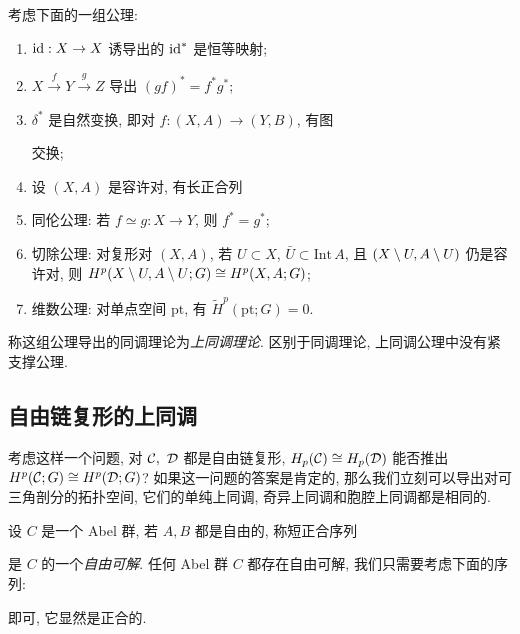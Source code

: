 考虑下面的一组公理:
\begin{enumerate}
	\item $ \mathrm{id} : X\to X $ 诱导出的 $ \mathrm{id}^* $ 是恒等映射;
	\item $ X\stackrel{f}{\to}Y\stackrel{g}{\to}Z $ 导出 $ (gf)^*=f^*g^* $;
	\item $ \delta^* $ 是自然变换, 即对 $ f : (X,A)\to(Y,B) $, 有图
	\begin{center}
	\end{center}
	交换;
	\item 设 $ (X,A) $ 是容许对, 有长正合列
	\begin{center}
	\end{center}
	\item 同伦公理: 若 $ f\simeq g : X\to Y $, 则 $ f^*=g^* $;
	\item 切除公理: 对复形对 $ (X,A) $, 若 $ U\subset X $, $ \bar{U}\subset\mathrm{Int}\,A $, 且 $ (X\setminus U,A\setminus U) $ 仍是容许对, 则 $ H^p(X\setminus U,A\setminus U;G)\cong H^p(X,A;G) $;
	\item 维数公理: 对单点空间 $ \mathrm{pt} $, 有 $ \tilde{H}^p(\mathrm{pt};G)=0 $.
\end{enumerate}
称这组公理导出的同调理论为\emph{上同调理论}. 区别于同调理论, 上同调公理中没有紧支撑公理.

\subsection{自由链复形的上同调}

考虑这样一个问题, 对 $ \mathcal{C},\ \mathcal{D} $ 都是自由链复形, $ H_p(\mathcal{C})\cong H_p(\mathcal{D}) $ 能否推出 $ H^p(\mathcal{C};G)\cong H^p(\mathcal{D};G) $? 如果这一问题的答案是肯定的, 那么我们立刻可以导出对可三角剖分的拓扑空间, 它们的单纯上同调, 奇异上同调和胞腔上同调都是相同的.

\begin{Definition}[自由可解]
	设 $ C $ 是一个 Abel 群, 若 $ A,B $ 都是自由的, 称短正合序列
	\begin{center}
	\end{center}
	是 $ C $ 的一个\emph{自由可解}. 任何 Abel 群 $ C $ 都存在自由可解, 我们只需要考虑下面的序列:
	\begin{center}
	\end{center}
	即可, 它显然是正合的.
\end{Definition}


